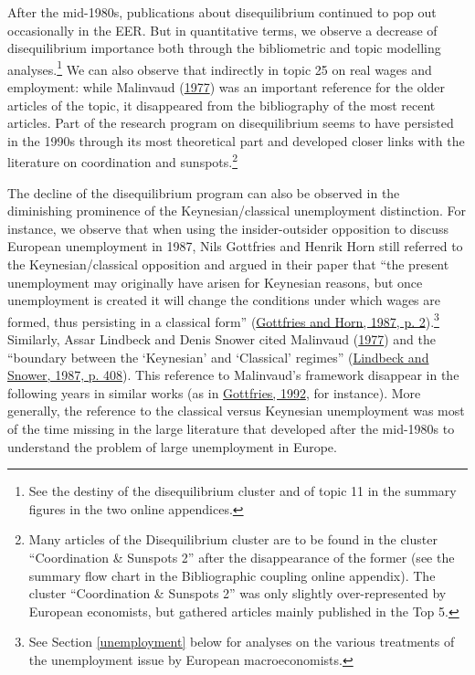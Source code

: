\documentclass[
  12pt,
  onecolumn]{article}
\begin{document}
After the mid-1980s, publications about disequilibrium continued to pop out occasionally in the EER. But in quantitative terms, we observe a decrease of disequilibrium importance both through the bibliometric and topic modelling analyses.\footnote{See the destiny of the disequilibrium cluster and of topic 11 in the summary figures in the two online appendices.} We can also observe that indirectly in topic 25 on real wages and employment: while Malinvaud (\protect\hyperlink{ref-malinvaud1977}{1977}) was an important reference for the older articles of the topic, it disappeared from the bibliography of the most recent articles. Part of the research program on disequilibrium seems to have persisted in the 1990s through its most theoretical part and developed closer links with the literature on coordination and sunspots.\footnote{Many articles of the Disequilibrium cluster are to be found in the cluster ``Coordination \& Sunspots 2'' after the disappearance of the former (see the summary flow chart in the Bibliographic coupling online appendix). The cluster ``Coordination \& Sunspots 2'' was only slightly over-represented by European economists, but gathered articles mainly published in the Top 5.}

The decline of the disequilibrium program can also be observed in the diminishing prominence of the Keynesian/classical unemployment distinction. For instance, we observe that when using the insider-outsider opposition to discuss European unemployment in 1987, Nils Gottfries and Henrik Horn still referred to the Keynesian/classical opposition and argued in their paper that ``the present unemployment may originally have arisen for Keynesian reasons, but once unemployment is created it will change the conditions under which wages are formed, thus persisting in a classical form'' (\protect\hyperlink{ref-gottfries1987}{Gottfries and Horn, 1987, p. 2}).\footnote{See Section \ref{unemployment} below for analyses on the various treatments of the unemployment issue by European macroeconomists.} Similarly, Assar Lindbeck and Denis Snower cited Malinvaud (\protect\hyperlink{ref-malinvaud1977}{1977}) and the ``boundary between the `Keynesian' and `Classical' regimes'' (\protect\hyperlink{ref-lindbeck1987a}{Lindbeck and Snower, 1987, p. 408}). This reference to Malinvaud's framework disappear in the following years in similar works (as in \protect\hyperlink{ref-gottfries1992}{Gottfries, 1992}, for instance). More generally, the reference to the classical versus Keynesian unemployment was most of the time missing in the large literature that developed after the mid-1980s to understand the problem of large unemployment in Europe.
\end{document}
